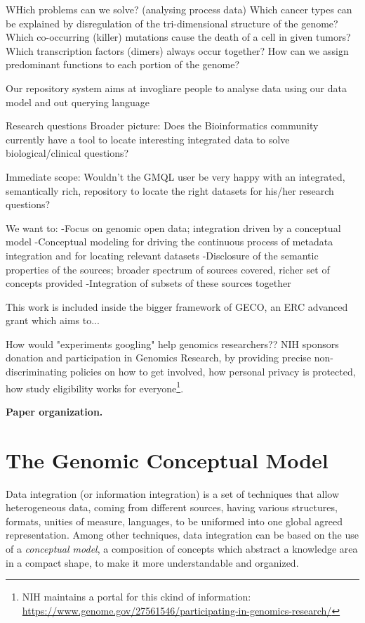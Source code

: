 \documentclass[journal]{IEEEtran}
\begin{document}
WHich problems can we solve? (analysing process data)
Which cancer types can be explained by disregulation of the tri-dimensional structure of the genome?
Which co-occurring (killer) mutations cause the death of a cell in given tumors?
Which transcription factors (dimers) always occur together?
How can we assign predominant functions to each portion of the genome?

Our repository system aims at invogliare people to analyse data using our data model and out querying language






Research questions
Broader picture: Does the Bioinformatics community currently have a tool to locate 
interesting integrated data 
to solve biological/clinical questions?

Immediate scope: Wouldn’t the GMQL user be very happy with an integrated, semantically rich, repository to locate the right datasets 
for his/her research questions?



We want to:
-Focus on genomic open data; integration driven by a conceptual model
-Conceptual modeling for driving the continuous process of metadata integration and for locating relevant datasets
-Disclosure of the semantic properties of the sources; broader spectrum of sources covered, richer set of concepts provided
-Integration of subsets of these sources together

This work is included inside the bigger framework of GECO, an ERC advanced grant which aims to...

How would "experiments googling" help genomics researchers??
NIH sponsors donation and participation in Genomics Research, by providing precise non-discriminating policies on how to get involved, how personal privacy is protected, how study eligibility works for everyone\footnote{NIH maintains a portal for this ckind of information: \url{https://www.genome.gov/27561546/participating-in-genomics-research/}}.


\textbf{Paper organization.}




\section{The Genomic Conceptual Model}

Data integration (or information integration) is a set of techniques that allow heterogeneous data, coming from different sources, having various structures, formats, unities of measure, languages, to be uniformed into one global agreed representation.
Among other techniques, data integration can be based on the use of a \textit{conceptual model}, a composition of concepts which abstract a knowledge area in a compact shape, to make it more understandable and organized.
\end{document}

